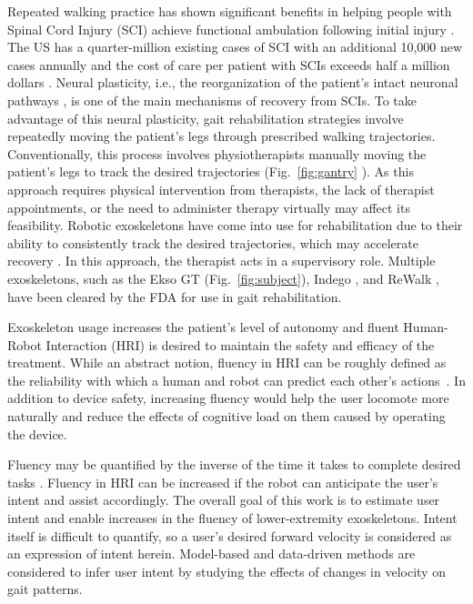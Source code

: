 Repeated walking practice has shown significant benefits in helping people with Spinal Cord Injury (SCI) achieve functional ambulation following initial injury \cite{lam2007systematic}. The US has a quarter-million existing cases of SCI with an additional 10,000 new cases annually \cite{nih} and the cost of care per patient with SCIs exceeds half a million dollars \cite{devivo2011costs}. Neural plasticity, i.e., the reorganization of the patient's intact neuronal pathways \cite{curt2008recovery}, is one of the main mechanisms of recovery from SCIs. To take advantage of this neural plasticity, gait rehabilitation strategies involve repeatedly moving the patient's legs through prescribed walking trajectories. Conventionally, this process involves physiotherapists manually moving the patient's legs to track the desired trajectories (Fig.~\ref{fig:gantry} \cite{gaitrehabgantry}). %
As this approach requires physical intervention from therapists, the lack of therapist appointments, or the need to administer therapy virtually may affect its feasibility. Robotic exoskeletons have come into use for rehabilitation due to their ability to consistently track the desired trajectories, which may accelerate recovery \cite{hidler2011role}. In this approach, the therapist acts in a supervisory role. Multiple exoskeletons, such as the Ekso GT \cite{brenner2016exploring} (Fig.~\ref{fig:subject}), Indego \cite{sup2008design}, and ReWalk \cite{rewalk}, have been cleared by the FDA for use in gait rehabilitation.

Exoskeleton usage increases the patient's level of autonomy and fluent Human-Robot Interaction (HRI) is desired to maintain the safety and efficacy of the treatment. While an abstract notion, fluency in HRI can be roughly defined as the reliability with which a human and robot can predict each other's actions~\cite{hoffman2007cost}. In addition to device safety, increasing fluency would help the user locomote more naturally and reduce the effects of cognitive load \cite{bogen2018walk} on them caused by operating the device.

Fluency may be quantified by the inverse of the time it takes to complete desired tasks \cite{hoffman2019evaluating}. Fluency in HRI can be increased if the robot can anticipate the user's intent and assist accordingly. The overall goal of this work is to estimate user intent and enable increases in the fluency of lower-extremity exoskeletons. Intent itself is difficult to quantify, so a user's desired forward velocity is considered as an expression of intent herein. Model-based and data-driven methods are considered to infer user intent by studying the effects of changes in velocity on gait patterns.

